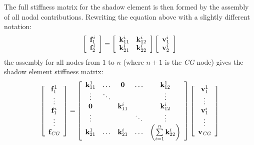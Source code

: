 The full stiffness matrix for the shadow element is then formed by the assembly
of all nodal contributions.
Rewriting the equation above with a slightly different notation:
%
\begin{equation}
\left[\begin{array}{c}
{\bf f}^i_1 \\ {\bf f}^i_2 \\
\end{array}\right]
=
\left[\begin{array}{cc}
 {\bf k}^i_{11} &  {\bf k}^i_{12} \\
 {\bf k}^i_{21} &  {\bf k}^i_{22} \\
\end{array}\right]
\left[\begin{array}{c}
{\bf v}^i_1 \\ {\bf v}^i_2\\
\end{array}\right]
\end{equation}
%
the assembly for all nodes from $1$ to $n$ (where $n+1$ is the \textit{CG} node)
gives the shadow element stiffness matrix:
%
\begin{equation}
\left[\begin{array}{c}
{\bf f}^1_1 \\ \vdots \\ {\bf f}^i_1 \\ \vdots \\ {\bf f}_\textit{CG} \\
\end{array}\right]
=
\left[\begin{array}{ccccc}
 {\bf k}^1_{11} & \hdots & {\bf 0}        & \hdots   &  {\bf k}^1_{12} \\
 \vdots         & \ddots &                &          &  \vdots         \\
 {\bf 0}        &        & {\bf k}^i_{11} &          &  {\bf k}^i_{12}  \\
 \vdots         &        &                & \ddots   &  \vdots         \\
 {\bf k}^1_{21} & \hdots & {\bf k}^i_{21} & \hdots   &
\left(\sum\limits_{i=1}^n {\bf k}^i_{22}\right) \\
\end{array}\right]
\left[\begin{array}{c}
{\bf v}^1_1 \\ \vdots \\ {\bf v}^i_1 \\ \vdots \\ {\bf v}_\textit{CG} \\
\end{array}\right]
\end{equation}

